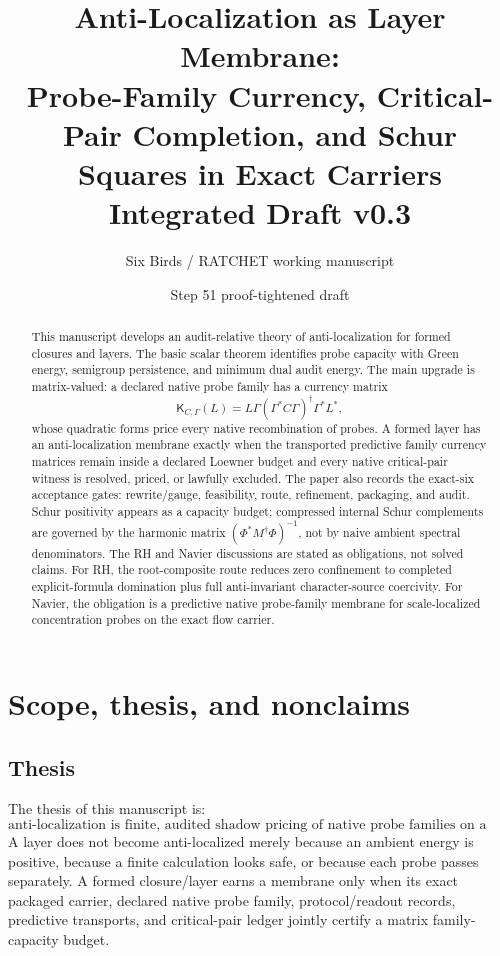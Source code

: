 \documentclass[11pt]{article}
\title{Anti-Localization as Layer Membrane:\\
Probe-Family Currency, Critical-Pair Completion, and Schur Squares in Exact Carriers\\
\large Integrated Draft v0.3}
\author{Six Birds / RATCHET working manuscript}
\date{Step 51 proof-tightened draft}
\newcommand{\K}{\mathsf K}
\begin{document}
\maketitle

\begin{abstract}
This manuscript develops an audit-relative theory of anti-localization for formed closures and layers.  The basic scalar theorem identifies probe capacity with Green energy, semigroup persistence, and minimum dual audit energy.  The main upgrade is matrix-valued: a declared native probe family has a currency matrix
\[
  \K_{C,\Gamma}(L)=L\Gamma(\Gamma^*C\Gamma)^\dagger\Gamma^*L^*,
\]
whose quadratic forms price every native recombination of probes.  A formed layer has an anti-localization membrane exactly when the transported predictive family currency matrices remain inside a declared Loewner budget and every native critical-pair witness is resolved, priced, or lawfully excluded.  The paper also records the exact-six acceptance gates: rewrite/gauge, feasibility, route, refinement, packaging, and audit.  Schur positivity appears as a capacity budget; compressed internal Schur complements are governed by the harmonic matrix \((\Phi^*M^\dagger\Phi)^{-1}\), not by naive ambient spectral denominators.  The RH and Navier discussions are stated as obligations, not solved claims.  For RH, the root-composite route reduces zero confinement to completed explicit-formula domination plus full anti-invariant character-source coercivity.  For Navier, the obligation is a predictive native probe-family membrane for scale-localized concentration probes on the exact flow carrier.
\end{abstract}

\tableofcontents

\section{Scope, thesis, and nonclaims}

\subsection{Thesis}
The thesis of this manuscript is:
\[
\boxed{\text{anti-localization is finite, audited shadow pricing of native probe families on a formed layer.}}
\]
A layer does not become anti-localized merely because an ambient energy is positive, because a finite calculation looks safe, or because each probe passes separately.  A formed closure/layer earns a membrane only when its exact packaged carrier, declared native probe family, protocol/readout records, predictive transports, and critical-pair ledger jointly certify a matrix family-capacity budget.
\end{document}
